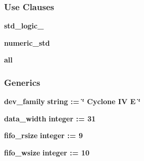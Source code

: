 \subsubsection*{Use Clauses}
 \begin{DoxyCompactItemize}
\item 
{\bf std\+\_\+logic\+\_}   
\item 
{\bf numeric\+\_\+std}   
\item 
{\bf  all }   
\end{DoxyCompactItemize}
\subsubsection*{Generics}
 \begin{DoxyCompactItemize}
\item 
{\bf dev\+\_\+family} {\bfseries {\bfseries \textcolor{comment}{string}\textcolor{vhdlchar}{ }\textcolor{vhdlchar}{ }\textcolor{vhdlchar}{\+:}\textcolor{vhdlchar}{=}\textcolor{vhdlchar}{ }\textcolor{vhdlchar}{ }\textcolor{vhdlchar}{ }\textcolor{vhdlchar}{ }\textcolor{keyword}{\char`\"{} Cyclone I\+V E \char`\"{}}\textcolor{vhdlchar}{ }}}
\item 
{\bf data\+\_\+width} {\bfseries {\bfseries \textcolor{comment}{integer}\textcolor{vhdlchar}{ }\textcolor{vhdlchar}{ }\textcolor{vhdlchar}{\+:}\textcolor{vhdlchar}{=}\textcolor{vhdlchar}{ }\textcolor{vhdlchar}{ } \textcolor{vhdldigit}{31} \textcolor{vhdlchar}{ }}}
\item 
{\bf fifo\+\_\+rsize} {\bfseries {\bfseries \textcolor{comment}{integer}\textcolor{vhdlchar}{ }\textcolor{vhdlchar}{ }\textcolor{vhdlchar}{\+:}\textcolor{vhdlchar}{=}\textcolor{vhdlchar}{ }\textcolor{vhdlchar}{ } \textcolor{vhdldigit}{9} \textcolor{vhdlchar}{ }}}
\item 
{\bf fifo\+\_\+wsize} {\bfseries {\bfseries \textcolor{comment}{integer}\textcolor{vhdlchar}{ }\textcolor{vhdlchar}{ }\textcolor{vhdlchar}{\+:}\textcolor{vhdlchar}{=}\textcolor{vhdlchar}{ }\textcolor{vhdlchar}{ } \textcolor{vhdldigit}{10} \textcolor{vhdlchar}{ }}}
\end{DoxyCompactItemize}
